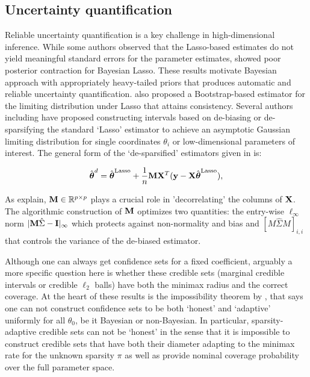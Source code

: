 \documentclass[sts,preprint]{imsart}
\begin{document}
\subsection{Uncertainty quantification}

Reliable uncertainty quantification is a key challenge in high-dimensional inference. While some authors \citep[e.g.]{chatterjee2011bootstrapping} observed that the Lasso-based estimates do not yield meaningful standard errors for the parameter estimates, \cite{castillo2015bayesian} showed poor posterior contraction for Bayesian Lasso. These results motivate Bayesian approach with appropriately heavy-tailed priors that produces automatic and reliable uncertainty quantification. \citet{chatterjee2011bootstrapping} also proposed a Bootstrap-based estimator for the limiting distribution under Lasso that attains consistency. Several authors including \citet{liu2013asymptotic, zhang2014confidence, van2014asymptotically, javanmard2014confidence} have proposed constructing intervals based on de-biasing or de-sparsifying the standard `Lasso' estimator to achieve an asymptotic Gaussian limiting distribution for single coordinates $\theta_i$ or low-dimensional parameters of interest. The general form of the `de-sparsified' estimators given in \citet{javanmard2014confidence} is:

\[
\hat{\boldsymbol{\theta}}^d = \hat{\boldsymbol{\theta}}^{\text{Lasso}} + \frac{1}{n} {\bf M} {\bf X}^T ({\bf y} - {\bf X} \hat{\boldsymbol{\theta}}^{\text{Lasso}}),
\]

As \citet{javanmard2014confidence} explain, ${\bf M} \in \mathbb{R}^{p \times p}$ plays a crucial role in 'decorrelating' the columns of ${\bf X}$. The algorithmic construction of ${\bf M}$ optimizes two quantities: the entry-wise $\ell_\infty$ norm $\lvert{\bf M}\hat{\Sigma} - {\bf I}\rvert_{\infty}$ which protects against non-normality and bias and $[M\hat{\Sigma}M]_{i,i}$ that controls the variance of the de-biased estimator. 


Although one can always get confidence sets for a fixed coefficient, arguably a more specific question here is whether these credible sets (marginal credible intervals or credible $\ell_2$ balls) have both the minimax radius and the correct coverage. At the heart of these results is the impossibility theorem by \citet{li1989honest}, that says one can not construct confidence sets to be both `honest' and `adaptive' uniformly for all $\theta_0$, be it Bayesian or non-Bayesian. In particular, sparsity-adaptive credible sets can not be `honest' \citep{nickl2013confidence,li1989honest} in the sense that it is impossible to construct credible sets that have both their diameter adapting to the minimax rate for the unknown sparsity $\pi$ as well as provide nominal coverage probability over the full parameter space. 
\end{document}
